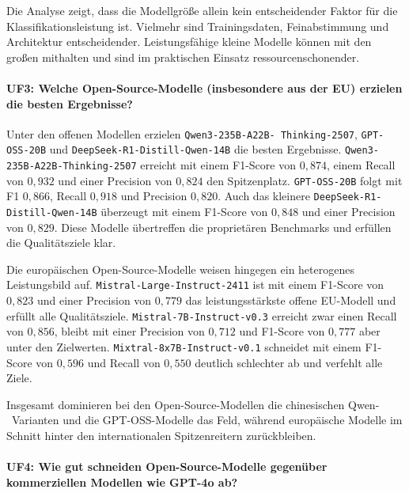 Die Analyse zeigt, dass die Modellgröße allein kein entscheidender Faktor für die Klassifikationsleistung ist. Vielmehr sind Trainingsdaten, Feinabstimmung und Architektur entscheidender. Leistungsfähige kleine Modelle können mit den großen mithalten und sind im praktischen Einsatz ressourcenschonender.

\paragraph{UF3: Welche Open-Source-Modelle (insbesondere aus der EU) erzielen die besten Ergebnisse?}

Unter den offenen Modellen erzielen \texttt{Qwen3-235B-A22B-\linebreak~Thinking-2507}, \texttt{GPT-OSS-20B} und \texttt{DeepSeek-R1-Distill-Qwen-14B} die besten Ergebnisse. \texttt{Qwen3-235B-A22B-Thinking-2507} erreicht mit einem F1-Score von $0{,}874$, einem Recall von $0{,}932$ und einer Precision von $0{,}824$ den Spitzenplatz. \texttt{GPT-OSS-20B} folgt mit F1 $0{,}866$, Recall $0{,}918$ und Precision $0{,}820$. Auch das kleinere \texttt{DeepSeek-R1-Distill-Qwen-14B} überzeugt mit einem F1-Score von $0{,}848$ und einer Precision von $0{,}829$. Diese Modelle übertreffen die proprietären Benchmarks und erfüllen die Qualitätsziele klar.

Die europäischen Open-Source-Modelle weisen hingegen ein heterogenes Leistungsbild auf. \texttt{Mistral-Large-Instruct-2411} ist mit einem F1-Score von $0{,}823$ und einer Precision von $0{,}779$ das leistungsstärkste offene EU-Modell und erfüllt alle Qualitätsziele. \texttt{Mistral-7B-Instruct-v0.3} erreicht zwar einen Recall von $0{,}856$, bleibt mit einer Precision von $0{,}712$ und F1-Score von $0{,}777$ aber unter den Zielwerten. \texttt{Mixtral-8x7B-Instruct-v0.1} schneidet mit einem F1-Score von $0{,}596$ und Recall von $0{,}550$ deutlich schlechter ab und verfehlt alle Ziele.

Insgesamt dominieren bei den Open-Source-Modellen die chinesischen Qwen-\linebreak~Varianten und die GPT-OSS-Modelle das Feld, während europäische Modelle im Schnitt hinter den internationalen Spitzenreitern zurückbleiben.

\paragraph{UF4: Wie gut schneiden Open-Source-Modelle gegenüber kommerziellen Modellen wie GPT-4o ab?}

